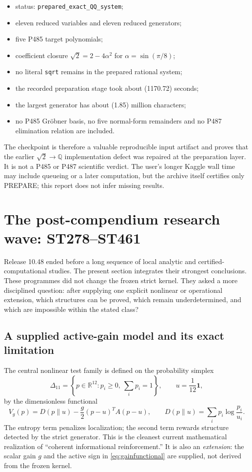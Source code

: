 \documentclass[11pt,a4paper]{article}
\theoremstyle{definition}
\theoremstyle{remark}
\newcommand{\R}{\mathbb R}
\newcommand{\one}{\bm 1}
\begin{document}
\begin{itemize}
\item status: \texttt{prepared\_exact\_QQ\_system};
\item eleven reduced variables and eleven reduced generators;
\item five P485 target polynomials;
\item coefficient closure $\sqrt2=2-4\alpha^2$ for $\alpha=\sin(\pi/8)$;
\item no literal \texttt{sqrt} remains in the prepared rational system;
\item the recorded preparation stage took about (1170.72) seconds;
\item the largest generator has about (1.85) million characters;
\item no P485 Gröbner basis, no five normal-form remainders and no P487 elimination relation are included.
\end{itemize}

The checkpoint is therefore a valuable reproducible input artifact and proves that the earlier $\sqrt2\to\mathbb Q$ implementation defect was repaired at the preparation layer. It is not a P485 or P487 scientific verdict. The user's longer Kaggle wall time may include queueing or a later computation, but the archive itself certifies only PREPARE; this report does not infer missing results.

\section{The post-compendium research wave: ST278--ST461}

Release 10.48 ended before a long sequence of local analytic and certified-computational studies. The present section integrates their strongest conclusions. These programmes did not change the frozen strict kernel. They asked a more disciplined question: after supplying one explicit nonlinear or operational extension, which structures can be proved, which remain underdetermined, and which are impossible within the stated class?

\subsection{A supplied active-gain model and its exact limitation}

The central nonlinear test family is defined on the probability simplex
\[
\Delta_{11}=\left\{p\in\R^{12}:p_i\ge0,\ \sum_i p_i=1\right\},
\qquad u=\frac1{12}\one,
\]
by the dimensionless functional
\begin{equation}
\label{eq:gainfunctional}
V_g(p)=D(p\|u)-\frac g2(p-u)^TA(p-u),
\qquad
D(p\|u)=\sum_i p_i\log\frac{p_i}{u_i}.
\end{equation}
The entropy term penalizes localization; the second term rewards structure detected by the strict generator. This is the cleanest current mathematical realization of ``coherent informational reinforcement.'' It is also an \emph{extension}: the scalar gain $g$ and the active sign in \eqref{eq:gainfunctional} are supplied, not derived from the frozen kernel.
\end{document}
